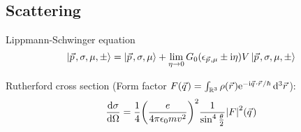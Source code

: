 	\subsection{Scattering}
		\noindent
		Lippmann-Schwinger equation
		\begin{equation}
			\Ket{\vec{p},\sigma,\mu,\pm} = \Ket{\vec{p}, \sigma, \mu} + \lim_{\eta\rightarrow 0} G_0(\epsilon_{\vec{p},\mu}\pm \i\eta) V \Ket{\vec{p},\sigma,\mu,\pm}
		\end{equation}

		\noindent
		Rutherford cross section (Form factor $F(\vec{q}) = \int_{\mathbb{R}^3} \rho(\vec{r}) \ex^{-\i \vec{q}\cdot\vec{r}/\hbar}\, \dd^3 \vec{r} $):
		\begin{equation}
			\dv{\sigma}{\Omega} = \frac{1}{4} \qty(\frac{e}{4\pi\epsilon_0 m v^2})^2
			\frac{1}{\sin^4\frac{\theta}{2}} \abs{F}^2(\vec{q})
		\end{equation}
